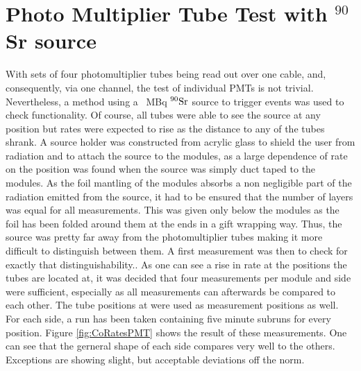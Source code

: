   \section{Photo Multiplier Tube Test with $^{90}$Sr source} %
  \label{ch:Analysis:sec:PhotoMultiplierTests}
  
  With sets of four photomultiplier tubes being read out over one cable, and, consequently, via one channel, the test of individual PMTs is not trivial. Nevertheless, a method using a \SI{}{\mega\becquerel} $\rm ^{90}Sr$ source to trigger events was used to check functionality. Of course, all tubes were able to see the source at any position but rates were expected to rise as the distance to any of the tubes shrank. A source holder was constructed from acrylic glass to shield the user from radiation and to attach the source to the modules, as a large dependence of rate on the position was found when the source was simply duct taped to the modules. As the foil mantling of the modules absorbs a non negligible part of the radiation emitted from the source, it had to be ensured that the number of layers was equal for all measurements. This was given only below the modules as the foil has been folded around them at the ends in a gift wrapping way. Thus, the source was pretty far away from the photomultiplier 
tubes making it more difficult to distinguish between them. A first measurement was then to check for exactly that distinguishability..
  As one can see a rise in rate at the positions the tubes are located at, it was decided that four measurements per module and side were sufficient, especially as all measurements can afterwards be compared to each other.
  The tube positions at  were used as measurement positions as well. For each side, a run has been taken containing five minute subruns for every position. Figure \ref{fig:CoRatesPMT} shows the result of these measurements. One can see that the gerneral shape of each side compares very well to the others. Exceptions are showing slight, but acceptable deviations off the norm.
